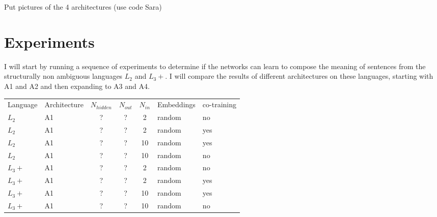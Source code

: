 \documentclass{article}
\begin{document}
Put pictures of the 4 architectures (use code Sara)

\section{Experiments}

I will start by running a sequence of experiments to determine if the networks can learn to compose the meaning of sentences from the structurally non ambiguous languages $L_2$ and $L_3+$. I will compare the results of different architectures on these languages, starting with A1 and A2 and then expanding to A3 and A4.

\begin{table}[!ht]
\begin{tabular}{|llcccll|}
    \hline
    Language & Architecture & $N_{hidden}$ & $N_{out}$ & $N_{in}$ & Embeddings & co-training\\
    $L_2$ & A1 & ? & ? & 2 & random & no\\
    $L_2$ & A1 & ? & ? & 2 & random & yes\\
    $L_2$ & A1 & ? & ? & 10 & random & yes\\
    $L_2$ & A1 & ? & ? & 10 & random & no\\
    $L_3+$ & A1 & ? & ? & 2 & random & no\\
    $L_3+$ & A1 & ? & ? & 2 & random & yes\\
    $L_3+$ & A1 & ? & ? & 10 & random & yes\\
    $L_3+$ & A1 & ? & ? & 10 & random & no\\
\hline
\end{tabular}

\end{table}

% 
\end{document}
